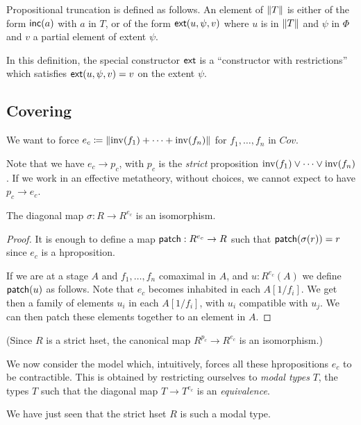 \medskip    

Propositional truncation is defined as follows. An element of $\left\lVert T \right\rVert$ is either of the form
$\mathsf{inc}(a)$ with $a$ in $T$, or of the form $\mathsf{ext}(u,\psi,v)$ where $u$ is in $\left\lVert T \right\rVert$ and $\psi$
in $\Phi$ and $v$ a partial element of extent $\psi$.

In this definition, the special constructor $\mathsf{ext}$ is a ``constructor with restrictions'' which
satisfies $\mathsf{ext}(u,\psi,v) = v$ on the extent $\psi$.

\subsection{Covering}

We want to force $e_c \coloneqq \left\lVert \mathrm{inv}(f_1)+\dots+\mathrm{inv}(f_n) \right\rVert$ for $f_1,\dots,f_n$ in $Cov$.

Note that we have $e_c\rightarrow p_c$, with $p_c$ is the {\em strict} proposition $\mathrm{inv}(f_1)\vee \dots\vee\mathrm{inv}(f_n)$.
If we work in an effective metatheory, without choices, we cannot expect to have $p_c\rightarrow e_c$.

\begin{lemma}
  The diagonal map $\sigma:R\rightarrow R^{e_c}$ is an isomorphism.
\end{lemma}

\begin{proof}
  It is enough to define a map $\mathsf{patch}:R^{e_c}\rightarrow R$ such that $\mathsf{patch}(\sigma(r)) = r$ since
  $e_c$ is a hproposition.

  If we are at a stage $A$ and $f_1,\dots,f_n$ comaximal in $A$, and $u:R^{e_c}(A)$ we define $\mathsf{patch}(u)$ as follows.
  Note that $e_c$ becomes inhabited in each $A[1/f_i]$. We get then a family of elements $u_i$ in each $A[1/f_i]$, with $u_i$ compatible
  with $u_j$. We can then patch these elements together to an element in $A$.
\end{proof}

(Since $R$ is a strict hset, the canonical map $R^{p_c}\rightarrow R^{e_c}$ is an isomorphism.)

We now consider the model which, intuitively, forces all these hpropositions $e_c$ to be contractible.
This is obtained by restricting ourselves to {\em modal types} $T$, the types
$T$ such that the diagonal map $T\rightarrow T^{e_c}$ is an {\em equivalence}.

\medskip

We have just seen that the strict hset $R$ is such a modal type.

